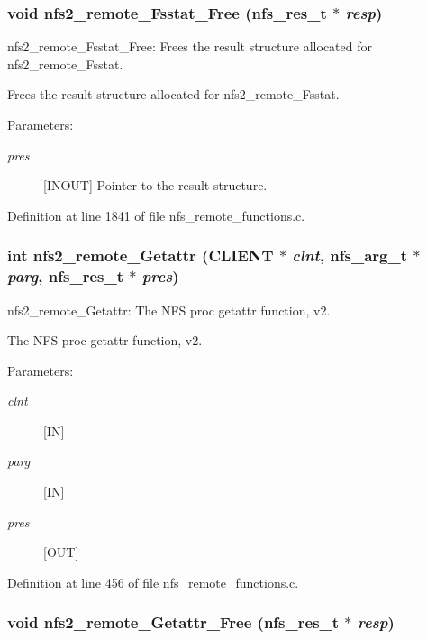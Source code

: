 \subsubsection{\setlength{\rightskip}{0pt plus 5cm}void nfs2\_\-remote\_\-Fsstat\_\-Free (nfs\_\-res\_\-t $\ast$ {\em resp})}\label{group__NFSprocs_ga67}


nfs2\_\-remote\_\-Fsstat\_\-Free: Frees the result structure allocated for nfs2\_\-remote\_\-Fsstat.

Frees the result structure allocated for nfs2\_\-remote\_\-Fsstat.

\begin{Desc}
\item[Parameters:]
\begin{description}
\item[{\em pres}][INOUT] Pointer to the result structure. \end{description}
\end{Desc}


Definition at line 1841 of file nfs\_\-remote\_\-functions.c.
\subsubsection{\setlength{\rightskip}{0pt plus 5cm}int nfs2\_\-remote\_\-Getattr (CLIENT $\ast$ {\em clnt}, nfs\_\-arg\_\-t $\ast$ {\em parg}, nfs\_\-res\_\-t $\ast$ {\em pres})}\label{group__NFSprocs_ga1}


nfs2\_\-remote\_\-Getattr: The NFS proc getattr function, v2.

The NFS proc getattr function, v2.

\begin{Desc}
\item[Parameters:]
\begin{description}
\item[{\em clnt}][IN] \item[{\em parg}][IN] \item[{\em pres}][OUT] \end{description}
\end{Desc}


Definition at line 456 of file nfs\_\-remote\_\-functions.c.
\subsubsection{\setlength{\rightskip}{0pt plus 5cm}void nfs2\_\-remote\_\-Getattr\_\-Free (nfs\_\-res\_\-t $\ast$ {\em resp})}\label{group__NFSprocs_ga55}


